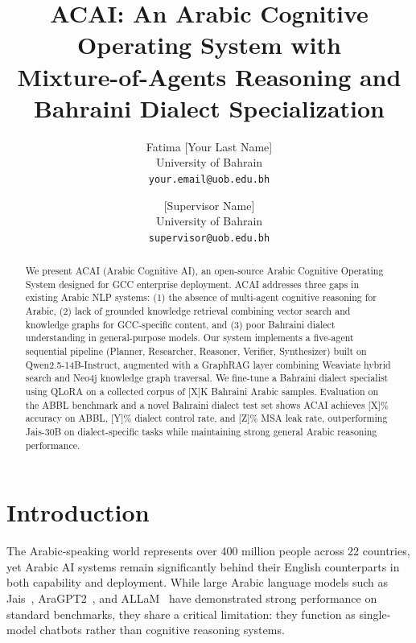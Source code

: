 \documentclass[11pt]{article}
\title{ACAI: An Arabic Cognitive Operating System with\\
Mixture-of-Agents Reasoning and Bahraini Dialect Specialization}
\author{
  Fatima [Your Last Name] \\
  University of Bahrain \\
  \texttt{your.email@uob.edu.bh} \and
  [Supervisor Name] \\
  University of Bahrain \\
  \texttt{supervisor@uob.edu.bh}
}
\begin{document}
\maketitle

\begin{abstract}

We present ACAI (Arabic Cognitive AI), an open-source Arabic Cognitive
Operating System designed for GCC enterprise deployment.
ACAI addresses three gaps in existing Arabic NLP systems:
(1) the absence of multi-agent cognitive reasoning for Arabic,
(2) lack of grounded knowledge retrieval combining vector search and
knowledge graphs for GCC-specific content, and
(3) poor Bahraini dialect understanding in general-purpose models.
Our system implements a five-agent sequential pipeline
(Planner, Researcher, Reasoner, Verifier, Synthesizer) built on
Qwen2.5-14B-Instruct, augmented with a GraphRAG layer combining
Weaviate hybrid search and Neo4j knowledge graph traversal.
We fine-tune a Bahraini dialect specialist using QLoRA on a
collected corpus of [X]K Bahraini Arabic samples.
Evaluation on the ABBL benchmark and a novel Bahraini dialect test set
shows ACAI achieves [X]\% accuracy on ABBL, [Y]\% dialect control rate,
and [Z]\% MSA leak rate, outperforming Jais-30B on dialect-specific tasks
while maintaining strong general Arabic reasoning performance.
\end{abstract}

\section{Introduction}

The Arabic-speaking world represents over 400 million people across
22 countries, yet Arabic AI systems remain significantly behind their
English counterparts in both capability and deployment.
While large Arabic language models such as Jais~\cite{jais2023},
AraGPT2~\cite{antoun2021},
and ALLaM~\cite{allam2024} have demonstrated strong performance on
standard benchmarks, they share a critical limitation:
they function as single-model chatbots rather than cognitive reasoning systems.
\end{document}
